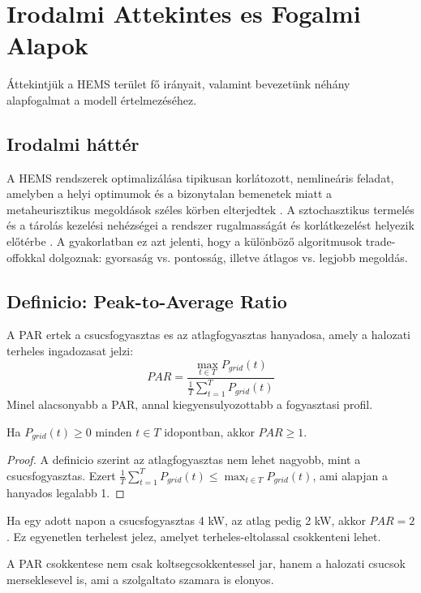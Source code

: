\chapter{Irodalmi Attekintes es Fogalmi Alapok}\label{ch:ALAPOK}

\begin{osszefoglal}
Áttekintjük a HEMS terület fő irányait, valamint bevezetünk néhány alapfogalmat a modell értelmezéséhez.
\end{osszefoglal}

\section{Irodalmi háttér}
A HEMS rendszerek optimalizálása tipikusan korlátozott, nemlineáris feladat, amelyben a helyi optimumok és a bizonytalan bemenetek miatt a metaheurisztikus megoldások széles körben elterjedtek \cite{Ismail2014}. A sztochasztikus termelés és a tárolás kezelési nehézségei a rendszer rugalmasságát és korlátkezelést helyezik előtérbe \cite{Fadaee2012}. A gyakorlatban ez azt jelenti, hogy a különböző algoritmusok trade-offokkal dolgoznak: gyorsaság vs. pontosság, illetve átlagos vs. legjobb megoldás.

\section{Definicio: Peak-to-Average Ratio}
\begin{ert}
A PAR ertek a csucsfogyasztas es az atlagfogyasztas hanyadosa, amely a halozati terheles ingadozasat jelzi:
\begin{equation}
PAR = \frac{\max\limits_{t \in T} P_{grid}(t)}{\frac{1}{T} \sum\limits_{t=1}^{T} P_{grid}(t)}
\label{eq:par_def}
\end{equation}
Minel alacsonyabb a PAR, annal kiegyensulyozottabb a fogyasztasi profil.
\end{ert}

\begin{tet}
Ha $P_{grid}(t) \ge 0$ minden $t \in T$ idopontban, akkor $PAR \ge 1$.
\end{tet}

\begin{proof}
A definicio szerint az atlagfogyasztas nem lehet nagyobb, mint a csucsfogyasztas. Ezert
\(
\frac{1}{T} \sum_{t=1}^{T} P_{grid}(t) \le \max_{t \in T} P_{grid}(t)
\), ami alapjan a hanyados legalabb 1.
\end{proof}

\begin{pld}
Ha egy adott napon a csucsfogyasztas 4 kW, az atlag pedig 2 kW, akkor $PAR = 2$. Ez egyenetlen terhelest jelez, amelyet terheles-eltolassal csokkenteni lehet.
\end{pld}

\begin{meg}
A PAR csokkentese nem csak koltsegcsokkentessel jar, hanem a halozati csucsok merseklesevel is, ami a szolgaltato szamara is elonyos.
\end{meg}
